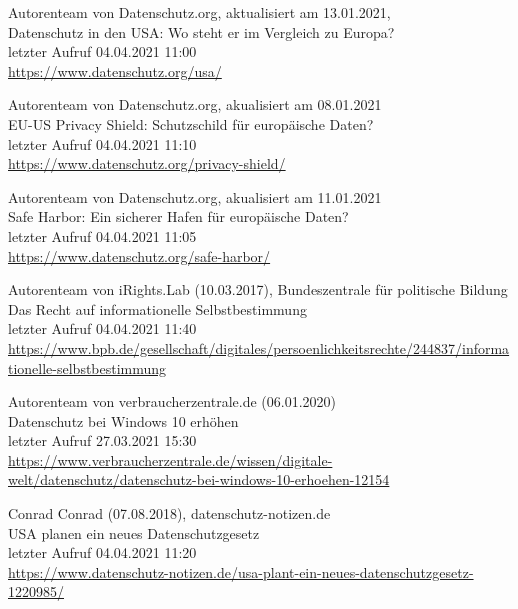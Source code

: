 \begin{thebibliography}{9}
    \bibitem{}
        Autorenteam von Datenschutz.org, aktualisiert am 13.01.2021,
        \\Datenschutz in den USA: Wo steht er im Vergleich zu Europa?
        \\letzter Aufruf 04.04.2021 11:00
        \\\url{https://www.datenschutz.org/usa/}

    \bibitem{}
        Autorenteam von Datenschutz.org, akualisiert am 08.01.2021
        \\EU-US Privacy Shield: Schutzschild für europäische Daten?
        \\letzter Aufruf 04.04.2021 11:10
        \\\url{https://www.datenschutz.org/privacy-shield/}

    \bibitem{}
        Autorenteam von Datenschutz.org, akualisiert am 11.01.2021
        \\Safe Harbor: Ein sicherer Hafen für europäische Daten?
        \\letzter Aufruf 04.04.2021 11:05
        \\\url{https://www.datenschutz.org/safe-harbor/}

    \bibitem{}
        Autorenteam von iRights.Lab (10.03.2017), Bundeszentrale für politische Bildung
        \\Das Recht auf informationelle Selbstbestimmung
        \\letzter Aufruf 04.04.2021 11:40
        \\\url{https://www.bpb.de/gesellschaft/digitales/persoenlichkeitsrechte/244837/informationelle-selbstbestimmung}

    \bibitem{}
        Autorenteam von verbraucherzentrale.de (06.01.2020)
        \\Datenschutz bei Windows 10 erhöhen
        \\letzter Aufruf 27.03.2021 15:30
        \\\url{https://www.verbraucherzentrale.de/wissen/digitale-welt/datenschutz/datenschutz-bei-windows-10-erhoehen-12154}

    \bibitem{}
        Conrad Conrad (07.08.2018), datenschutz-notizen.de
        \\USA planen ein neues Datenschutzgesetz
        \\letzter Aufruf 04.04.2021 11:20
        \\\url{https://www.datenschutz-notizen.de/usa-plant-ein-neues-datenschutzgesetz-1220985/}


\end{thebibliography}
